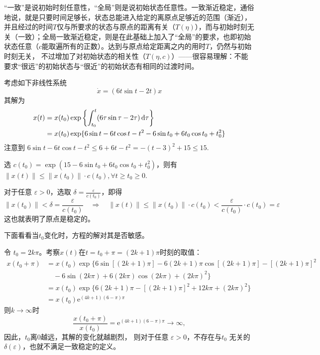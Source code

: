 \begin{note}
  “一致”是说初始时刻任意性，“全局”则是说初始状态任意性。一致渐近稳定，通俗地说，就是只要时间足够长，状态总能进入给定的离原点足够近的范围（渐近），
  并且经过的时间$T$仅与所要求的状态与原点的距离有关（$T(\eta)$），而与初始时刻无关（一致）；全局一致渐近稳定，则是在此基础上加入了“全局”的要求，也即初始状态任意（$c$能取遍所有的正数）。达到与原点给定距离之内的用时$T$，仍然与初始时刻无关，
  不过增加了对初始状态的相关性（$T(\eta,c)$）——很容易理解：不能要求“很远”的初始状态与“很近”的初始状态有相同的过渡时间。%
\end{note}
\begin{example}[稳定但不一致稳定]
  考虑如下非线性系统
  \[ \dot{x} = (6 t  \sin  t - 2 t) x \]
  其解为
  \begin{align*}
    x (t) & =  x (t_0) \exp \left\{ \int^t_{t_0} (6 \tau \sin \tau - 2 \tau)
    \mathop{}\!\mathrm{d} \tau \right\}\\
    & =  x (t_0) \exp \{ 6 \sin  t - 6 t  \cos  t - t^2 - 6 \sin  t_0 + 6
    t_0 \cos  t_0 + t^2_0 \}
  \end{align*}
  注意到 $6 \sin  t - 6 t  \cos  t - t^2 \leq 6 + 6 t - t^2 = - (t - 3)^2 + 15
  \leq 15$.
  
  选 $c (t_0) = \exp (15 - 6 \sin  t_0 + 6 t_0 \cos  t_0 + t^2_0)$，则有 $\| x (t) \| \leq \| x (t_0) \| \cdot c (t_0), \forall t
  \geq t_0 \geq 0$.
  
  对于任意 $\varepsilon > 0$，选取 $\delta = \frac{\varepsilon}{c (t_0)}$，即得
  \[ \| x (t_0) \| < \delta = \frac{\varepsilon}{c (t_0)} \quad \Rightarrow
     \quad \| x (t) \| \leq \| x (t_0) \| \cdot c (t_0) < \frac{\varepsilon}{c
     (t_0)} \cdot c (t_0) = \varepsilon \]
  这也就表明了原点是稳定的。
  
  下面看看当$t_0$变化时，方程的解对其是否敏感。

  令 $t_0 = 2 k \pi$。考察$x (t)$在$t = t_0 + \pi = (2 k + 1)\pi$时刻的取值：
  \begin{align*}
    x (t_0 + \pi) & =  x (t_0) \exp \{ 6 \sin [(2 k + 1) \pi] - 6 (2 k + 1)
    \pi \cos [(2 k + 1) \pi] - [(2 k + 1) \pi]^2 \\
    &  \quad - 6 \sin (2 k \pi) + 6 (2 k \pi) \cos (2 k \pi) + (2 k \pi)^2 \} \\
    & =  x (t_0) \exp \{ 6 (2 k + 1) \pi - [(2 k + 1) \pi]^2  + 12 k \pi +
    (2 k \pi)^2 \} \\
    & =  x (t_0) \mathrm{e}^{\left( \text{} 4 k + 1 \right) (6 - \pi) \pi}
  \end{align*}
  则$k \rightarrow\infty$时
  \[ \frac{x (t_0 + \pi)}{x (t_0)} = \mathrm{e}^{\left( \text{} 4 k + 1 \right) (6 -
     \pi) \pi} \rightarrow \infty,  \]
  因此，$t_0$离$0$越远，其解的变化就越剧烈，
  则对于任意 $\varepsilon > 0$，不存在与$t_0$ 无关的$\delta (\varepsilon)$，也就不满足一致稳定的定义。
\end{example}
